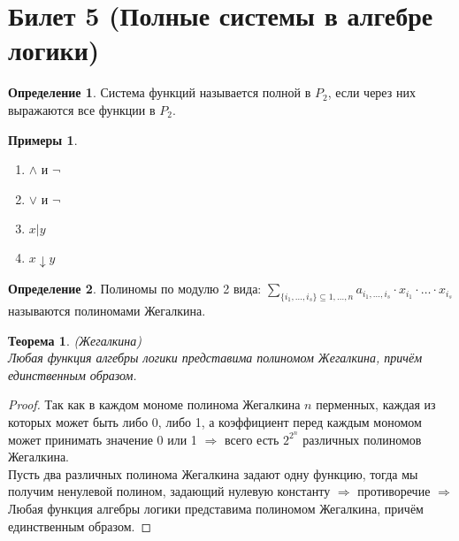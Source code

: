 \documentclass[a4paper, 12pt]{article}
\theoremstyle{definition}
\newtheorem*{definition}{Определение}
\newtheorem*{example}{Примеры}
\theoremstyle{plain}
\newtheorem*{theorem}{Теорема}
\theoremstyle{remark}
\begin{document}
  \section{Билет 5 (Полные системы в алгебре логики)}
  \begin{definition}
    Система функций называется полной в $P_2$, если через них выражаются все функции в $P_2$.
  \end{definition}
  \begin{example}
    \begin{enumerate}
      \item $\wedge$ и $\neg$
      \item $\vee$ и $\neg$
      \item $x|y$
      \item $x\downarrow y$
    \end{enumerate}
  \end{example}
  \begin{definition}
    Полиномы по модулю 2 вида: $\sum\limits_{\{i_1,\dots,i_s\}\subseteq{1,\ldots,n}}a_{i_1,\ldots,i_s}\cdot x_{i_1}\cdot\ldots\cdot x_{i_s}$ называются полиномами Жегалкина.
  \end{definition}
  \begin{theorem}(Жегалкина)\\
    Любая функция алгебры логики представима полиномом Жегалкина, причём единственным образом.
  \end{theorem}
  \begin{proof}
    Так как в каждом мономе полинома Жегалкина $n$ перменных, каждая из которых может быть либо 0, либо 1, а коэффициент перед каждым мономом может принимать значение 0 или 1 $\Longrightarrow$ всего есть $2^{2^n}$ различных полиномов Жегалкина.\\
    Пусть два различных полинома Жегалкина задают одну функцию, тогда мы получим ненулевой полином, задающий нулевую константу $\Longrightarrow$ противоречие $\Longrightarrow$  Любая функция алгебры логики представима полиномом Жегалкина, причём единственным образом.
  \end{proof}
\end{document}
